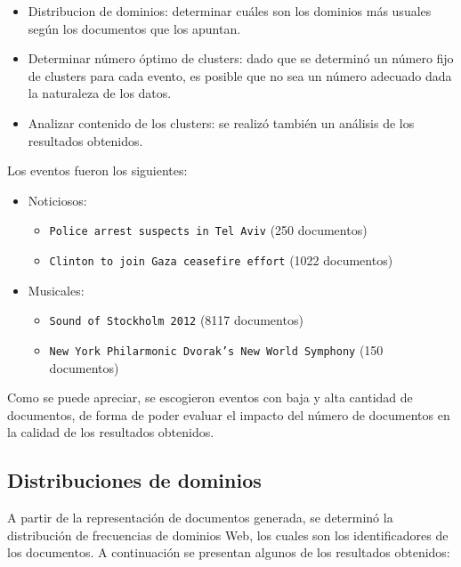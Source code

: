 \documentclass[upright, contnum]{umemoria}
\begin{document}
\begin{itemize}
\item Distribucion de dominios: determinar cuáles son los dominios más
    usuales según los documentos que los apuntan.
\item Determinar número óptimo de clusters: dado que se determinó un
    número fijo de clusters para cada evento, es posible que no sea un
    número adecuado dada la naturaleza de los datos.
\item Analizar contenido de los clusters: se realizó también un análisis
    de los resultados obtenidos.
\end{itemize}
  Los eventos fueron los siguientes:
\begin{itemize}
\item Noticiosos:

\begin{itemize}
\item \texttt{Police arrest suspects in Tel Aviv} (250 documentos)
\item \texttt{Clinton to join Gaza ceasefire effort} (1022 documentos)
\end{itemize}

\item Musicales:

\begin{itemize}
\item \texttt{Sound of Stockholm 2012} (8117 documentos)
\item \texttt{New York Philarmonic Dvorak's New World Symphony} (150
      documentos)
\end{itemize}

\end{itemize}
  Como se puede apreciar, se escogieron eventos con baja y alta
  cantidad de documentos, de forma de poder evaluar el impacto del
  número de documentos en la calidad de los resultados obtenidos.

\subsection{Distribuciones de dominios}
\label{sec-4.4.1}


    A partir de la representación de documentos generada, se determinó
    la distribución de frecuencias de dominios Web, los cuales son los
    identificadores de los documentos. A continuación se presentan
    algunos de los resultados obtenidos:
    
\end{document}
